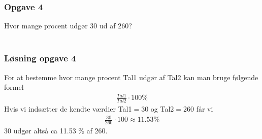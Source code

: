 \subsubsection{Opgave 4}

Hvor mange procent udgør 30 ud af 260?\\\\

\subsubsection*{Løsning opgave 4}
For at bestemme hvor mange procent Tal1 udgør af Tal2 kan man bruge følgende formel
\begin{align*}
    \frac{Tal1}{Tal2}\cdot 100\%
\end{align*}
Hvis vi indsætter de kendte værdier Tal1$=30$ og Tal2$=260$ får vi
\begin{align*}
    \frac{30}{260}\cdot 100 \approx 11.53 \%
\end{align*}
30 udgør altså ca 11.53 \% af 260.
\vspace*{1cm}